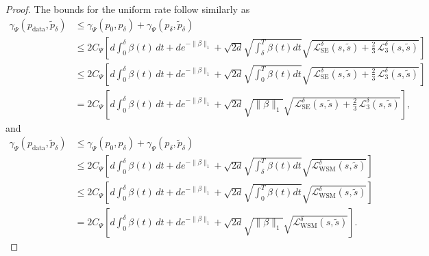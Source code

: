 \documentclass{article} %
\newcommand{\LWSM}{\mathcal{L}_{\mathrm{WSM}}}
\newcommand{\LSE}{\mathcal{L}_{\mathrm{SE}}}
\newcommand{\LThree}{\mathcal{L}_{3}}
\begin{document}
\begin{proof}
    The bounds for the uniform rate follow similarly as
    \begin{align*}
        \gamma_\Psi(p_\mathrm{data}, \tilde{p}_\delta) &\leq \gamma_\Psi(p_0, {p}_\delta) + \gamma_\Psi(p_\delta, \tilde{p}_\delta) \\
        &\leq 2 C_\Psi \left[ d\int_0^\delta \beta(t)\,dt + d e^{-\| \beta \|_1}   +   \sqrt{2 d} \sqrt{\int_\delta^T \beta(t) dt} \sqrt{ \,\LSE^\delta(s, \tilde{s}) + \tfrac{2}{3}\,\LThree^\delta(s, \tilde{s}) } \right] \\
        &\leq 2 C_\Psi \left[ d\int_0^\delta \beta(t)\,dt + d e^{-\| \beta \|_1}   +   \sqrt{2 d} \sqrt{\int_0^T \beta(t) dt} \sqrt{ \,\LSE^\delta(s, \tilde{s}) + \tfrac{2}{3}\,\LThree^\delta(s, \tilde{s}) } \right] \\
        &= 2 C_\Psi \left[ d\int_0^\delta \beta(t)\,dt + d e^{-\| \beta \|_1}   +   \sqrt{2 d} \sqrt{\|\beta \|_1}  \sqrt{ \,\LSE^\delta(s, \tilde{s}) + \tfrac{2}{3}\,\LThree^\delta(s, \tilde{s}) }  \right],
    \end{align*}
    and
    \begin{align*}
        \gamma_\Psi(p_\mathrm{data}, \tilde{p}_\delta) &\leq \gamma_\Psi(p_0, {p}_\delta) + \gamma_\Psi(p_\delta, \tilde{p}_\delta) \\
        &\leq 2 C_\Psi \left[ d\int_0^\delta \beta(t)\,dt + d e^{-\| \beta \|_1}   +   \sqrt{2 d} \sqrt{\int_\delta^T \beta(t) dt} \sqrt{\LWSM^\delta(s, \tilde{s})} \right] \\
        &\leq 2 C_\Psi \left[ d\int_0^\delta \beta(t)\,dt + d e^{-\| \beta \|_1}   +   \sqrt{2 d} \sqrt{\int_0^T \beta(t) dt} \sqrt{\LWSM^\delta(s, \tilde{s})} \right] \\
        &= 2 C_\Psi \left[ d\int_0^\delta \beta(t)\,dt + d e^{-\| \beta \|_1}   +   \sqrt{2 d} \sqrt{\|\beta \|_1}  \sqrt{\LWSM^\delta(s, \tilde{s})}  \right].
    \end{align*}


\end{proof}
\end{document}
